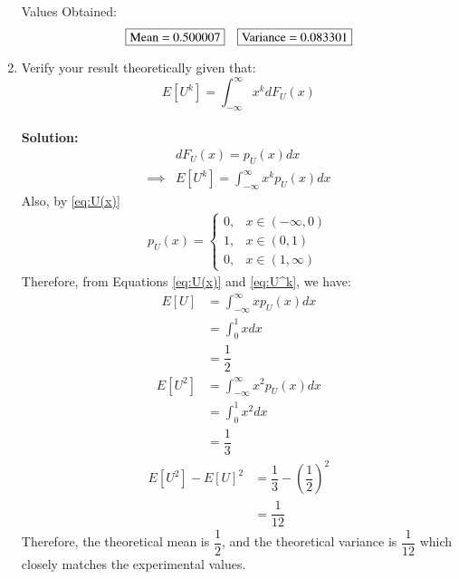 \documentclass[journal,12pt,twocolumn]{IEEEtran}
\numberwithin{equation}{section}
\renewcommand\thesection{\arabic{section}}
\providecommand{\sbrak}[1]{\ensuremath{{}\left[#1\right]}}
\providecommand{\brak}[1]{\ensuremath{\left(#1\right)}}
\newcommand{\solution}{\noindent \textbf{\\ Solution: }}
\begin{document}
\begin{enumerate}[label=\thesection.\arabic*,ref=\thesection.\theenumi]
\begin{lstlisting}
            \end{lstlisting}
          Values Obtained:
          \begin{align}
               & \fbox{Mean =  0.500007}
               & \fbox{Variance = 0.083301}
          \end{align}
    \item Verify your result theoretically given that:
          \begin{equation}
              E\sbrak{U^k} = \int_{-\infty}^{\infty}x^kdF_{U}(x)
          \end{equation}
          \solution
          \begin{align}
                       & dF_U(x) = p_U(x) dx                           \\
              \label{eq:U^k}
              \implies & E[U^k] = \int_{-\infty}^{\infty}x^k p_U(x) dx
          \end{align}
          Also, by \eqref{eq:U(x)}
          \begin{align}
              p_U(x) =
              \begin{cases}
                  0, & x \in (-\infty,0) \\
                  1, & x \in (0,1)       \\
                  0, & x \in (1, \infty)
              \end{cases}
          \end{align}
          Therefore, from Equations \ref{eq:U(x)} and \ref{eq:U^k}, we have:
          \begin{align}
              E[U] & =  \int_{-\infty}^{\infty}x p_U(x) dx \\
                   & = \int_0 ^1 x dx                      \\
                   & = \dfrac{1}{2}
          \end{align}
          \begin{align}
              E[U^2] & =  \int_{-\infty}^{\infty}x^2 p_U(x) dx \\
                     & = \int_0 ^1 x^2 dx                      \\
                     & = \dfrac{1}{3}
          \end{align}
          \begin{align}
              E[U^2] - E[U]^2 & = \dfrac{1}{3} - \brak{\dfrac{1}{2}}^2 \\
                              & = \dfrac{1}{12}
          \end{align}
          Therefore, the theoretical mean is $\dfrac{1}{2}$, and the theoretical variance is $\dfrac{1}{12}$ which closely matches the experimental values.
\end{enumerate}
\end{document}
